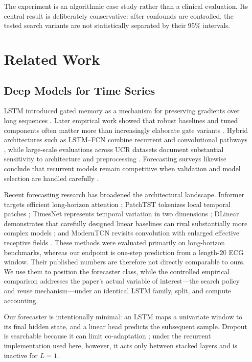 \documentclass[conference]{IEEEtran}
\begin{document}
The experiment is an algorithmic case study rather than a clinical evaluation. Its central result is deliberately conservative: after confounds are controlled, the tested search variants are not statistically separated by their 95\% intervals.

\section{Related Work}
\subsection{Deep Models for Time Series}
LSTM introduced gated memory as a mechanism for preserving gradients over long sequences \cite{hochreiter1997lstm}. Later empirical work showed that robust baselines and tuned components often matter more than increasingly elaborate gate variants \cite{greff2017search}. Hybrid architectures such as LSTM--FCN combine recurrent and convolutional pathways \cite{karim2018lstmfcn}, while large-scale evaluations across UCR datasets document substantial sensitivity to architecture and preprocessing \cite{fawaz2019review}. Forecasting surveys likewise conclude that recurrent models remain competitive when validation and model selection are handled carefully \cite{hewamalage2021rnn,lim2021survey}.

Recent forecasting research has broadened the architectural landscape. Informer targets efficient long-horizon attention \cite{zhou2021informer}; PatchTST tokenizes local temporal patches \cite{nie2023patchtst}; TimesNet represents temporal variation in two dimensions \cite{wu2023timesnet}; DLinear demonstrates that carefully designed linear baselines can rival substantially more complex models \cite{zeng2023dlinear}; and ModernTCN revisits convolution with enlarged effective receptive fields \cite{luo2024moderntcn}. These methods were evaluated primarily on long-horizon benchmarks, whereas our endpoint is one-step prediction from a length-20 ECG window. Their published numbers are therefore not directly comparable to ours. We use them to position the forecaster class, while the controlled empirical comparison addresses the paper's actual variable of interest---the search policy and reuse mechanism---under an identical LSTM family, split, and compute accounting.

Our forecaster is intentionally minimal: an LSTM maps a univariate window to its final hidden state, and a linear head predicts the subsequent sample. Dropout is searchable because it can limit co-adaptation \cite{srivastava2014dropout}; under the recurrent implementation used here, however, it acts only between stacked layers and is inactive for $L=1$.
\end{document}
